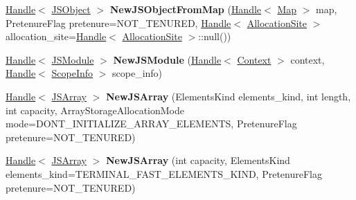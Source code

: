 \begin{DoxyCompactItemize}
\item 
\hyperlink{classv8_1_1internal_1_1_handle}{Handle}$<$ \hyperlink{classv8_1_1internal_1_1_j_s_object}{J\+S\+Object} $>$ {\bfseries New\+J\+S\+Object\+From\+Map} (\hyperlink{classv8_1_1internal_1_1_handle}{Handle}$<$ \hyperlink{classv8_1_1internal_1_1_map}{Map} $>$ map, Pretenure\+Flag pretenure=N\+O\+T\+\_\+\+T\+E\+N\+U\+R\+ED, \hyperlink{classv8_1_1internal_1_1_handle}{Handle}$<$ \hyperlink{classv8_1_1internal_1_1_allocation_site}{Allocation\+Site} $>$ allocation\+\_\+site=\hyperlink{classv8_1_1internal_1_1_handle}{Handle}$<$ \hyperlink{classv8_1_1internal_1_1_allocation_site}{Allocation\+Site} $>$\+::null())\hypertarget{classv8_1_1internal_1_1_factory_a0ab5a6fd26fd9f07799cecf3f34e1ab8}{}\label{classv8_1_1internal_1_1_factory_a0ab5a6fd26fd9f07799cecf3f34e1ab8}

\item 
\hyperlink{classv8_1_1internal_1_1_handle}{Handle}$<$ \hyperlink{classv8_1_1internal_1_1_j_s_module}{J\+S\+Module} $>$ {\bfseries New\+J\+S\+Module} (\hyperlink{classv8_1_1internal_1_1_handle}{Handle}$<$ \hyperlink{classv8_1_1internal_1_1_context}{Context} $>$ context, \hyperlink{classv8_1_1internal_1_1_handle}{Handle}$<$ \hyperlink{classv8_1_1internal_1_1_scope_info}{Scope\+Info} $>$ scope\+\_\+info)\hypertarget{classv8_1_1internal_1_1_factory_a1e32dbf09a662d056f0c506b1134418c}{}\label{classv8_1_1internal_1_1_factory_a1e32dbf09a662d056f0c506b1134418c}

\item 
\hyperlink{classv8_1_1internal_1_1_handle}{Handle}$<$ \hyperlink{classv8_1_1internal_1_1_j_s_array}{J\+S\+Array} $>$ {\bfseries New\+J\+S\+Array} (Elements\+Kind elements\+\_\+kind, int length, int capacity, Array\+Storage\+Allocation\+Mode mode=D\+O\+N\+T\+\_\+\+I\+N\+I\+T\+I\+A\+L\+I\+Z\+E\+\_\+\+A\+R\+R\+A\+Y\+\_\+\+E\+L\+E\+M\+E\+N\+TS, Pretenure\+Flag pretenure=N\+O\+T\+\_\+\+T\+E\+N\+U\+R\+ED)\hypertarget{classv8_1_1internal_1_1_factory_a502d4219fa2b72e57a28c2fbd4b0effe}{}\label{classv8_1_1internal_1_1_factory_a502d4219fa2b72e57a28c2fbd4b0effe}

\item 
\hyperlink{classv8_1_1internal_1_1_handle}{Handle}$<$ \hyperlink{classv8_1_1internal_1_1_j_s_array}{J\+S\+Array} $>$ {\bfseries New\+J\+S\+Array} (int capacity, Elements\+Kind elements\+\_\+kind=T\+E\+R\+M\+I\+N\+A\+L\+\_\+\+F\+A\+S\+T\+\_\+\+E\+L\+E\+M\+E\+N\+T\+S\+\_\+\+K\+I\+ND, Pretenure\+Flag pretenure=N\+O\+T\+\_\+\+T\+E\+N\+U\+R\+ED)\hypertarget{classv8_1_1internal_1_1_factory_ab6b5f314dce0712ebbca5c5d86c40afe}{}\label{classv8_1_1internal_1_1_factory_ab6b5f314dce0712ebbca5c5d86c40afe}


\end{DoxyCompactItemize}
